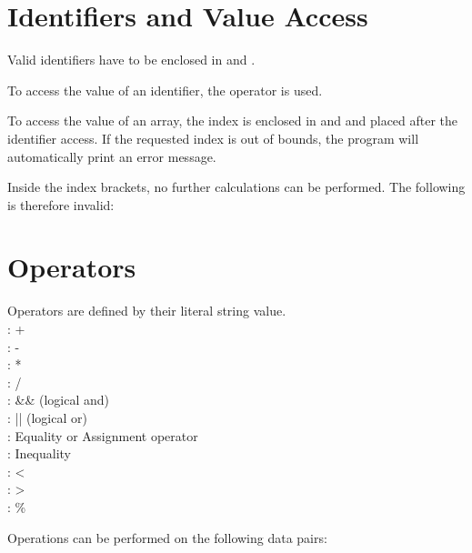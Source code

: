 
\section{Identifiers and Value Access}
Valid identifiers have to be enclosed in \greybox{\lbrack} and \greybox{\rbrack}.

\greybox{$[myVariable]$} \greybox{$[x]$} \greybox{$[myArray]$}

To access the value of an identifier, the \greybox{\textasciitilde} operator is used.

\greybox{\textasciitilde$[myVariable]$} \greybox{\textasciitilde$[x]$} \greybox{\textasciitilde$[myArray]$}

To access the value of an array, the index is enclosed in \greybox{(} and \greybox{)} and placed after the identifier access. If the requested index is out of bounds, the program will automatically print an error message.

 \greybox{\textasciitilde$[myArray]($\textasciitilde$[index])$}

Inside the index brackets, no further calculations can be performed. The following is therefore invalid:



\section{Operators}
Operators are defined by their literal string value.
    \\: +
    \\: -
    \\: *
    \\: /
    \\: \&\& (logical and)
    \\: || (logical or)
    \\: Equality or Assignment operator
    \\: Inequality
    \\: <
    \\: >
    \\: \%

Operations can be performed on the following data pairs:
    
